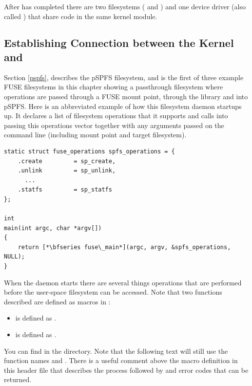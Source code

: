 \noindent
After  has completed there are two filesystems ( and ) and one device driver (also called ) that share code in the same kernel module. 


\subsection{Establishing Connection between the Kernel and }

Section \ref{pspfs}, describes the pSPFS filesystem, and is the first of three example FUSE filesystems in this chapter showing a passthrough filesystem where operations are passed through a FUSE mount point, through the library and into pSPFS. Here is an abbreviated example of how this filesystem daemon startups up. It declares a list of filesystem operations that it supports and calls into  passing this operations vector together with any arguments passed on the command line (including mount point and target filesystem).

\begin{lstlisting}
static struct fuse_operations spfs_operations = {
    .create         = sp_create,
    .unlink         = sp_unlink,
      ...
    .statfs         = sp_statfs
};

int
main(int argc, char *argv[])
{         
    return [*\bfseries fuse\_main*](argc, argv, &spfs_operations, NULL);
}   
\end{lstlisting}

\noindent
When the  daemon starts there are several things operations that are performed before the user-space filesystem can be accessed.  Note that two functions described are defined as macros in :

\begin{itemize}
	\item {} is defined as . 
	\item {} is defined as . 
\end{itemize}

\noindent	
You can find  in the  directory. Note that the following text will still use the function names  and . There is a useful comment above the macro definition in this header file that describes the process followed by  and error codes that can be returned.

